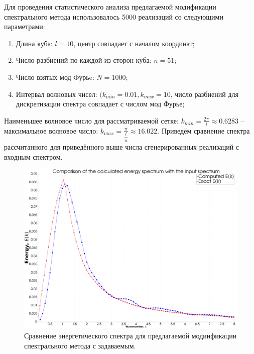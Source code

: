Для проведения статистического анализа предлагаемой модификации спектрального метода использовалось 5000 реализаций со следующими параметрами:
\begin{enumerate}
    \item Длина куба: $l = 10$, центр совпадает с началом координат;
    \item Число разбиений по каждой из сторон куба: $n = 51$;
    \item Число взятых мод Фурьe: $N = 1000$;
    \item Интервал волновых чисел: $(k_{min} = 0.01, k_{max} = 10$, число разбиений для дискретизации спектра совпадает с числом мод Фурье;
\end{enumerate}

Наименьшее волновое число для рассматриваемой сетке: $k_{min} = \frac{2 \pi}{l} \approx 0.6283$ -- максимальное волновое число: $k_{max} = \frac{\pi}{\dfrac{l}{n}} \approx 16.022$. Приведём сравнение спектра рассчитанного для приведённого выше числа сгенерированных реализаций с входным спектром.

\begin{figure}[ht] 
    \center
    \includegraphics [width=0.8\linewidth] {images/spectral/spectra_l10_k10_f1000_n51.png}
    \caption{Сравнение энергетического спектра для предлагаемой модиификации спектрального метода с задаваемым.} 
    \label{img:spectral_desam_spectra_comarison}  
\end{figure}

